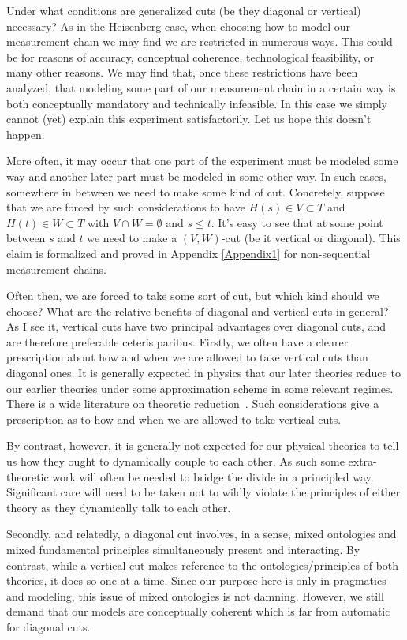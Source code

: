 \documentclass[12pt,prd,superscriptaddress,floatfix,amsmath,amssymb,amsfonts,nofootinbib]{revtex4-2}
\begin{document}
Under what conditions are generalized cuts (be they diagonal or vertical) necessary? As in the Heisenberg case, when choosing how to model our measurement chain we may find we are restricted in numerous ways. This could be for reasons of accuracy, conceptual coherence, technological feasibility, or many other reasons. We may find that, once these restrictions have been analyzed, that modeling some part of our measurement chain in a certain way is both conceptually mandatory and technically infeasible. In this case we simply cannot (yet) explain this experiment satisfactorily. Let us hope this doesn't happen.

More often, it may occur that one part of the experiment must be modeled some way and another later part must be modeled in some other way. In such cases, somewhere in between we need to make some kind of cut. Concretely, suppose that we are forced by such considerations to have \mbox{$H(s)\in V\subset T$} and \mbox{$H(t)\in W\subset T$} with $V\cap W=\emptyset$ and $s\leq t$. It's easy to see that at some point between $s$ and $t$ we need to make a $(V,W)$-cut (be it vertical or diagonal). This claim is formalized and proved in Appendix \ref{Appendix1} for non-sequential measurement chains.

Often then, we are forced to take some sort of cut, but which kind should we choose? What are the relative benefits of diagonal and vertical cuts in general? As I see it, vertical cuts have two principal advantages over diagonal cuts, and are therefore preferable ceteris paribus. Firstly, we often have a clearer prescription about how and when we are allowed to take vertical cuts than diagonal ones. It is generally expected in physics that our later theories reduce to our earlier theories under some approximation scheme in some relevant regimes. There is a wide literature on theoretic reduction~\cite{sep-physics-interrelate,Rosaler}. Such considerations give a prescription as to how and when we are allowed to take vertical cuts. 

By contrast, however, it is generally not expected for our physical theories to tell us how they ought to dynamically couple to each other. As such some extra-theoretic work will often be needed to bridge the divide in a principled way. Significant care will need to be taken not to wildly violate the principles of either theory as they dynamically talk to each other.

Secondly, and relatedly, a diagonal cut involves, in a sense, mixed ontologies and mixed fundamental principles simultaneously present and interacting. By contrast, while a vertical cut makes reference to the ontologies/principles of both theories, it does so one at a time. Since our purpose here is only in pragmatics and modeling, this issue of mixed ontologies is not damning. However, we still demand that our models are conceptually coherent which is far from automatic for diagonal cuts.
\end{document}
